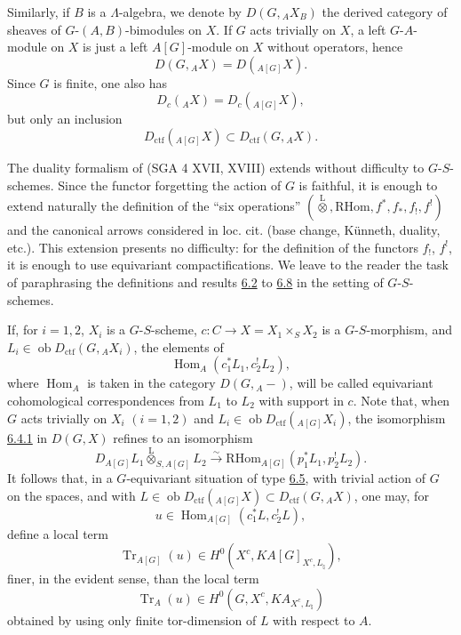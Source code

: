 \documentclass[11pt]{article}
\DeclareMathOperator{\Hom}{Hom}
\providecommand{\RHom}{\mathrm{RHom}}
\providecommand{\Tr}{\operatorname{Tr}}
\providecommand{\Tr}{\operatorname{Tr}}
\providecommand{\lten}{\overset{\mathrm L}{\otimes}}
\providecommand{\Ob}{\operatorname{ob}}
\providecommand{\Tr}{\operatorname{Tr}}
\providecommand{\RHom}{\mathrm{RHom}}
\providecommand{\Hom}{\operatorname{Hom}}
\providecommand{\lten}{\overset{\mathrm L}{\otimes}}
\providecommand{\RHom}{\mathrm R\mathcal{H}om}
\providecommand{\lten}{\overset{\mathrm L}{\otimes}}
\providecommand{\Ob}{\operatorname{ob}}
\providecommand{\Tr}{\operatorname{Tr}}
\providecommand{\lten}{\overset{\mathrm L}{\otimes}}
\providecommand{\lten}{\overset{\mathrm L}{\otimes}}
\providecommand{\Ob}{\operatorname{Ob}}
\providecommand{\lten}{\overset{\mathrm L}{\otimes}}
\providecommand{\RHom}{\mathrm{RHom}}
\providecommand{\Hom}{\operatorname{Hom}}
\providecommand{\Tr}{\operatorname{Tr}}
\providecommand{\Ob}{\operatorname{ob}}
\providecommand{\Ob}{\operatorname{Ob}}
\providecommand{\lten}{\overset{\mathrm L}{\otimes}}
\begin{document}
Similarly, if $B$ is a $\Lambda$-algebra, we denote by $D(G,{}_AX_B)$ the derived category of sheaves of $G$-$(A,B)$-bimodules on $X$. If $G$ acts trivially on $X$, a left $G$-$A$-module on $X$ is just a left $A[G]$-module on $X$ without operators, hence
\[
D(G,{}_AX)=D({}_{A[G]}X).
\]
Since $G$ is finite, one also has
\[
D_c({}_AX)=D_c({}_{A[G]}X),
\]
but only an inclusion
\[
D_{\mathrm{ctf}}({}_{A[G]}X)\subset D_{\mathrm{ctf}}(G,{}_AX).
\]

The duality formalism of (SGA 4 XVII, XVIII) extends without difficulty to $G$-$S$-schemes. Since the functor forgetting the action of $G$ is faithful, it is enough to extend naturally the definition of the “six operations” $(\lten,\RHom,f^*,f_*,f_!,f^!)$ and the canonical arrows considered in loc. cit. (base change, Künneth, duality, etc.). This extension presents no difficulty: for the definition of the functors $f_!$, $f^!$, it is enough to use equivariant compactifications. We leave to the reader the task of paraphrasing the definitions and results \hyperref[sga5:IIIB:subsection:6.2]{6.2} to \hyperref[sga5:IIIB:subsection:6.8]{6.8} in the setting of $G$-$S$-schemes.

If, for $i=1,2$, $X_i$ is a $G$-$S$-scheme, $c:C\to X=X_1\times_SX_2$ is a $G$-$S$-morphism, and $L_i\in\Ob D_{\mathrm{ctf}}(G,{}_AX_i)$, the elements of
\[
\Hom_A(c_1^*L_1,c_2^!L_2),
\]
where $\Hom_A$ is taken in the category $D(G,{}_A-)$, will be called equivariant cohomological correspondences from $L_1$ to $L_2$ with support in $c$. Note that, when $G$ acts trivially on $X_i$ $(i=1,2)$ and $L_i\in\Ob D_{\mathrm{ctf}}({}_{A[G]}X_i)$, the isomorphism \hyperref[sga5:IIIB:equation:6.4.1]{6.4.1} in $D(G,X)$ refines to an isomorphism
\[
D_{A[G]}L_1\lten_{S,A[G]}L_2
\xrightarrow{\sim}
\RHom_{A[G]}(p_1^*L_1,p_2^!L_2).
\]
It follows that, in a $G$-equivariant situation of type \hyperref[sga5:IIIB:subsection:6.5]{6.5}, with trivial action of $G$ on the spaces, and with $L\in\Ob D_{\mathrm{ctf}}({}_{A[G]}X)\subset D_{\mathrm{ctf}}(G,{}_AX)$, one may, for
\[
u\in\Hom_{A[G]}(c_1^*L,c_2^!L),
\]
define a local term
\[
\Tr_{A[G]}(u)\in H^0(X^c,KA[G]_{X^c,L_{\natural}}),
\]
finer, in the evident sense, than the local term
\[
\Tr_A(u)\in H^0(G,X^c,KA_{X^c,L_{\natural}})
\]
obtained by using only finite tor-dimension of $L$ with respect to $A$.
\end{document}
